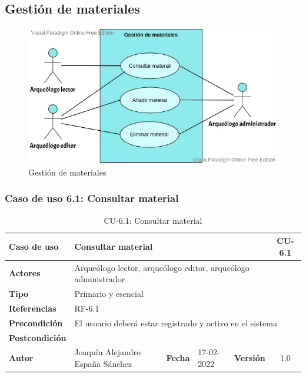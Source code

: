 \subsection{Gestión de materiales}
    \begin{figure}[H]
        \centering
        \includegraphics[scale=0.50]{imagenes/diagramas CU/material-UC.jpeg}
        \caption{Gestión de materiales}
        \label{fig:material-management}
    \end{figure}

\subsubsection{Caso de uso 6.1: Consultar material}

    \begin{table}[H]
    \begin{center}
        \begin{adjustbox}{width=\textwidth}
        \begin{tabular}{ | l | l | l | l | c | c | } 
            \hline
            \textbf{Caso de uso} & \multicolumn{4}{l|}{Consultar material} & \cellcolor{gray!50} \textbf{CU-6.1}\\
            \hline
            \textbf{Actores} & \multicolumn{5}{p{0.9\linewidth}|}{Arqueólogo lector, arqueólogo editor, arqueólogo administrador} \\
            \hline
            \textbf{Tipo} & \multicolumn{5}{l|}{Primario y esencial} \\
            \hline
            \textbf{Referencias} & \multicolumn{3}{l|}{RF-6.1} & \multicolumn{2}{l|}{ }\\
            \hline
            \textbf{Precondición} & \multicolumn{5}{l|}{El usuario deberá estar registrado y activo en el sistema} \\
            \hline
            \textbf{Postcondición} & \multicolumn{5}{l|}{} \\
            \hline
            \textbf{Autor} & \multicolumn{1}{p{0.25\linewidth}|}{Joaquín Alejandro España Sánchez} & \textbf{Fecha} & 
            17-02-2022     & \textbf{Versión}                                                      & 1.0\\
            \hline
        \end{tabular}
        \end{adjustbox}
        \caption{CU-6.1: Consultar material}
        \label{tab:consult-material}
    \end{center}
    \end{table}

